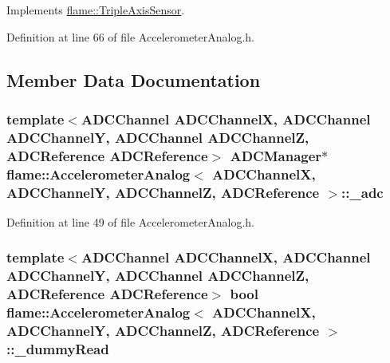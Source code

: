 Implements \hyperlink{classflame_1_1_triple_axis_sensor_ac2ff28538723dc987c6fbec20aa47341}{flame\-::\-Triple\-Axis\-Sensor}.



Definition at line 66 of file Accelerometer\-Analog.\-h.



\subsection{Member Data Documentation}
\hypertarget{classflame_1_1_accelerometer_analog_ac3dda0476fa8c65185f8d6620225b0a3}{
\subsubsection[{\-\_\-adc}]{\setlength{\rightskip}{0pt plus 5cm}template$<$A\-D\-C\-Channel A\-D\-C\-Channel\-X, A\-D\-C\-Channel A\-D\-C\-Channel\-Y, A\-D\-C\-Channel A\-D\-C\-Channel\-Z, A\-D\-C\-Reference A\-D\-C\-Reference$>$ {\bf A\-D\-C\-Manager}$\ast$ {\bf flame\-::\-Accelerometer\-Analog}$<$ A\-D\-C\-Channel\-X, A\-D\-C\-Channel\-Y, A\-D\-C\-Channel\-Z, {\bf A\-D\-C\-Reference} $>$\-::\-\_\-adc\hspace{0.3cm}{\ttfamily [protected]}}}\label{classflame_1_1_accelerometer_analog_ac3dda0476fa8c65185f8d6620225b0a3}


Definition at line 49 of file Accelerometer\-Analog.\-h.

\hypertarget{classflame_1_1_accelerometer_analog_a16e72bdbf27a8f4ba5b5ed068620d84c}{
\subsubsection[{\-\_\-dummy\-Read}]{\setlength{\rightskip}{0pt plus 5cm}template$<$A\-D\-C\-Channel A\-D\-C\-Channel\-X, A\-D\-C\-Channel A\-D\-C\-Channel\-Y, A\-D\-C\-Channel A\-D\-C\-Channel\-Z, A\-D\-C\-Reference A\-D\-C\-Reference$>$ bool {\bf flame\-::\-Accelerometer\-Analog}$<$ A\-D\-C\-Channel\-X, A\-D\-C\-Channel\-Y, A\-D\-C\-Channel\-Z, {\bf A\-D\-C\-Reference} $>$\-::\-\_\-dummy\-Read\hspace{0.3cm}{\ttfamily [protected]}}}\label{classflame_1_1_accelerometer_analog_a16e72bdbf27a8f4ba5b5ed068620d84c}


